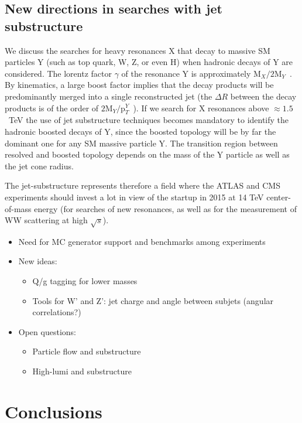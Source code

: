 \documentclass{PoS}
\begin{document}
\subsection{New directions in searches with jet substructure}
We discuss the searches for heavy resonances X that decay to massive SM particles Y (such as top quark, W, Z, or even H) 
when hadronic decays of Y are considered. The lorentz factor $\gamma$ of the resonance 
Y is approximately $\mbox{M}_{X} / 2 \mbox{M}_{Y}$~\cite{Gouzevitch:2013qca}. By kinematics, a large boost factor implies 
that the decay products will be predominantly merged into a single reconstructed jet (the $\Delta R$ between the decay 
products is of the order of $2 \mbox{M}_{Y} / \mbox{p}_{T}^{Y}$~\cite{ATLAS-CONF-2012-065}). If we search for X resonances above $\approx 1.5$~TeV the use of jet substructure techniques becomes mandatory to identify the hadronic boosted decays of Y, since the boosted topology will be by far the dominant one for any SM massive particle Y. The transition region between resolved and boosted topology depends on the mass of the Y particle as well as the jet cone radius. 

The jet-substructure represents therefore a field where the ATLAS and CMS experiments should invest a lot in view of the startup in 2015 at 14 TeV center-of-mass energy (for searches of new resonances, as well as for the measurement of 
WW scattering at high $\sqrt{s}$).

\begin{itemize}
\item Need for MC generator support and benchmarks among experiments
\cite{Chatrchyan:2013rla}%
\cite{ATLAS:2012am}%
\item New ideas:
\begin{itemize}
 \item Q/g tagging for lower masses
 \item Tools for W' and Z': jet charge and angle between subjets (angular correlations?)
\end{itemize}
\item Open questions:
\begin{itemize}
 \item Particle flow and substructure
 \item High-lumi and substructure
\end{itemize}

\end{itemize}


\section{Conclusions}
\end{document}
